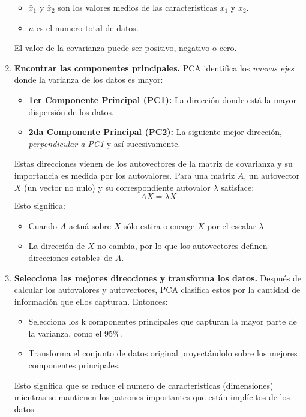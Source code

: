 \documentclass[spanish,11pt,letterpaper,oneside]{memoir}
\begin{document}
\begin{enumerate}
\begin{itemize}
			\item $\bar{x}_1$ y $\bar{x}_2$ son los valores medios de las caracteristicas $x_1$ y $x_2$.
			\item $n$ es el numero total de datos.
		\end{itemize}
		El valor de la covarianza puede ser positivo, negativo o cero.
		\item \textbf{Encontrar las componentes principales.}
		PCA identifica los \textit{nuevos ejes} donde la varianza de los datos es mayor:
		\begin{itemize}
			\item \textbf{1er Componente Principal (PC1):} La dirección donde está la mayor dispersión de los datos.
			\item \textbf{2da Componente Principal (PC2):} La siguiente mejor dirección, \textit{perpendicular a PC1} y así sucesivamente.
		\end{itemize}
		Estas direcciones vienen de los autovectores de la matriz de covarianza y su importancia es medida por los autovalores. Para una matriz $A$, un autovector $X$ (un vector no nulo) y su correspondiente autovalor $\lambda$ satisface:
		\begin{equation}
			\label{eq:autovalores}
			AX = \lambda X
		\end{equation}
		Esto significa:
		\begin{itemize}
			\item Cuando $A$ actuá sobre $X$ sólo estira o encoge $X$ por el escalar $\lambda$.
			\item La dirección de $X$ no cambia, por lo que los autovectores definen \guillemetleft direcciones estables\guillemetright \ de $A$.
		\end{itemize}
		\item \textbf{Selecciona las mejores direcciones y transforma los datos.}
		Después de calcular los autovalores y autovectores, PCA clasifica estos por la cantidad de información que ellos capturan. Entonces: 
		\begin{itemize}
			\item Selecciona los k componentes principales que capturan la mayor parte de la varianza, como el 95\%.
			\item Transforma el conjunto de datos original proyectándolo sobre los mejores componentes principales. 
		\end{itemize}
		Esto significa que se reduce el numero de caracteristicas (dimensiones) mientras se mantienen los patrones importantes que están implícitos de los datos.
	\end{enumerate}
	
\end{document}
